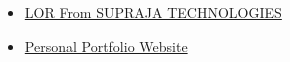 \documentclass[]{deedy-resume-openfont}
\begin{document}
\begin{minipage}[t]{0.66\textwidth}
\begin{itemize}
\item \href{https://www.dropbox.com/s/hqq1zifyjrmaot8/LOR%20WORK.pdf?dl=0}{LOR From SUPRAJA TECHNOLOGIES}
\end{itemize}


\sectionsep
{}
\vspace{\topsep}
\begin{itemize}
\item \href{https://madhav-sai.github.io/Portfolio/}{Personal Portfolio Website }
\end{itemize}








\end{minipage} 
\end{document}

